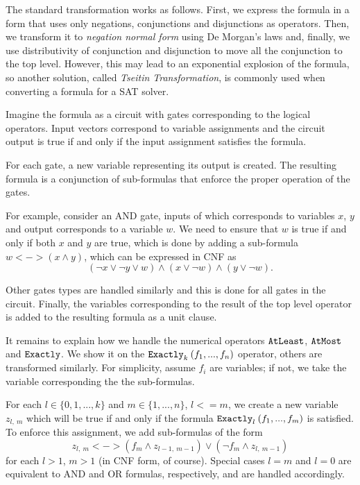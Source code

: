 The standard transformation works as follows.
First, we express the formula in a form
  that uses only negations, conjunctions and disjunctions as operators.
Then, we transform it to \emph{negation normal form} using De Morgan's laws
  and, finally, we use distributivity of conjunction and disjunction to
  move all the conjunction to the top level.
However, this may lead to an exponential explosion of the formula, so
another solution, called \emph{Tseitin Transformation}, is commonly used
  when converting a formula for a SAT solver\cite{tseitin}.

Imagine the formula as a circuit with gates corresponding to the logical operators.
Input vectors correspond to variable assignments and the circuit output
  is true if and only if the input assignment satisfies the formula.

For each gate, a new variable representing its output is created.
The resulting formula is a conjunction of sub-formulas that enforce
  the proper operation of the gates.

For example, consider an AND gate, inputs of which corresponds to variables
  $x$, $y$ and output corresponds to a variable $w$.
We need to ensure that $w$ is true if and only if both $x$ and $y$ are true,
  which is done by adding a sub-formula $w <-> (x \wedge y)$, which can be
  expressed in CNF as
\[
(\neg x \vee \neg y \vee w) \wedge
(x \vee \neg w) \wedge
(y \vee \neg w).
\]

Other gates types are handled similarly and this is done for all gates in the circuit.
Finally, the variables
  corresponding to the result of the top level operator is added
  to the resulting formula as a unit clause.

It remains to explain how we handle the numerical operators
  $\mathtt{AtLeast}$, $\mathtt{AtMost}$ and $\mathtt{Exactly}$.
We show it on the $\mathtt{Exactly}_{k}\:(f_1, ..., f_n)$ operator,
  others are transformed similarly. For simplicity,
  assume $f_i$ are variables; if not, we take the variable corresponding the
  the sub-formulas.

For each $l\in\{0,1,...,k\}$ and $m\in\{1,...,n\}$, $l <= m$, we create
  a new variable $z_{l,\:m}$ which will be true if and only if
  the formula $\mathtt{Exactly}_{l}\:(f_1, ..., f_m)$ is satisfied.
To enforce this assignment, we add sub-formulas of the form
  \[ z_{l,\:m} <-> (f_m \wedge z_{l-1,\:m-1}) \vee (\neg f_m \wedge z_{l,\:m-1}) \]
  for each $l > 1$, $m > 1$ (in CNF form, of course).
Special cases $l = m$ and $l = 0$ are equivalent to AND and OR formulas, respectively,
  and are handled accordingly.


